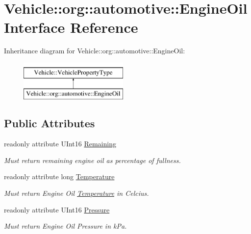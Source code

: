 \hypertarget{interfaceVehicle_1_1org_1_1automotive_1_1EngineOil}{\section{Vehicle\-:\-:org\-:\-:automotive\-:\-:Engine\-Oil Interface Reference}
\label{interfaceVehicle_1_1org_1_1automotive_1_1EngineOil}
}
Inheritance diagram for Vehicle\-:\-:org\-:\-:automotive\-:\-:Engine\-Oil\-:\begin{figure}[H]
\begin{center}
\leavevmode
\includegraphics[height=2.000000cm]{interfaceVehicle_1_1org_1_1automotive_1_1EngineOil}
\end{center}
\end{figure}
\subsection*{Public Attributes}
\begin{DoxyCompactItemize}
\item 
readonly attribute U\-Int16 \hyperlink{interfaceVehicle_1_1org_1_1automotive_1_1EngineOil_ae125deb8dab3cc33f61691de8d3e9c37}{Remaining}
\begin{DoxyCompactList}\small\item\em Must return remaining engine oil as percentage of fullness. \end{DoxyCompactList}\item 
readonly attribute long \hyperlink{interfaceVehicle_1_1org_1_1automotive_1_1EngineOil_a9f285574ac7c85dcd5607de88be54187}{Temperature}
\begin{DoxyCompactList}\small\item\em Must return Engine Oil \hyperlink{interfaceVehicle_1_1org_1_1automotive_1_1Temperature}{Temperature} in Celcius. \end{DoxyCompactList}\item 
readonly attribute U\-Int16 \hyperlink{interfaceVehicle_1_1org_1_1automotive_1_1EngineOil_a3f1ce0b704bc925d9a4cc6e49251c77d}{Pressure}
\begin{DoxyCompactList}\small\item\em Must return Engine Oil Pressure in k\-Pa. \end{DoxyCompactList}\end{DoxyCompactItemize}


